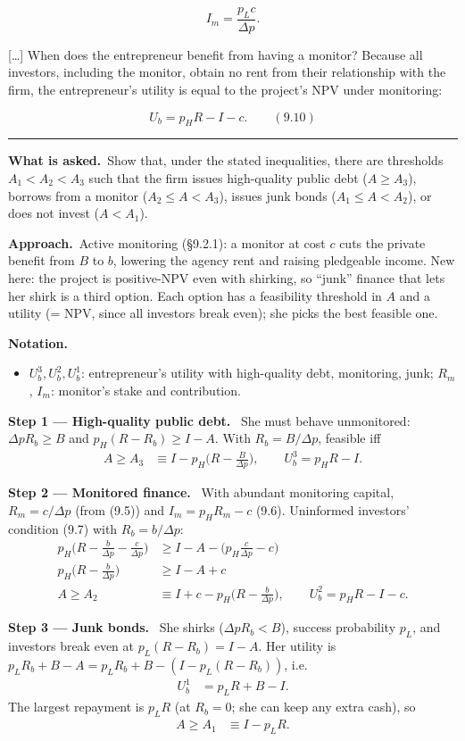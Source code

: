 \documentclass[11pt,a4paper]{article}
\newcommand{\notation}{\par\noindent\textbf{Notation.}}
\newcommand{\step}[2]{\par\medskip\noindent\textbf{Step #1 --- #2.}~}
\newcommand{\asked}{\par\medskip\noindent\textbf{What is asked.}~}
\newcommand{\approach}{\par\smallskip\noindent\textbf{Approach.}~}
\newcommand{\dpp}{\Delta p}
\newcommand{\stmtend}{\par\endgroup\nopagebreak\noindent\rule{\linewidth}{0.4pt}\par\medskip}
\begin{document}
\[I_m = \frac{p_L c}{\Delta p}.\]

{[}\ldots{]} When does the entrepreneur benefit from having a monitor? Because all investors,
including the monitor, obtain no rent from their relationship with the firm, the entrepreneur's
utility is equal to the project's NPV under monitoring:

\[U_b = p_H R - I - c. \qquad (9.10)\]
\stmtend

\asked Show that, under the stated inequalities, there are thresholds $A_1<A_2<A_3$ such that the firm issues high-quality public debt ($A\ge A_3$), borrows from a monitor ($A_2\le A<A_3$), issues junk bonds ($A_1\le A<A_2$), or does not invest ($A<A_1$).

\approach Active monitoring (\S9.2.1): a monitor at cost $c$ cuts the private benefit from $B$ to $b$, lowering the agency rent and raising pledgeable income. New here: the project is positive-NPV even with shirking, so ``junk'' finance that lets her shirk is a third option. Each option has a feasibility threshold in $A$ and a utility (= NPV, since all investors break even); she picks the best feasible one.

\notation
\begin{itemize}
  \item $U^3_b,U^2_b,U^1_b$: entrepreneur's utility with high-quality debt, monitoring, junk; $R_m$, $I_m$: monitor's stake and contribution.
\end{itemize}

\step{1}{High-quality public debt} She must behave unmonitored: $\dpp R_b\ge B$ and $p_H(R-R_b)\ge I-A$. With $R_b=B/\dpp$, feasible iff
\begin{align}
  A\ge A_3 &\equiv I-p_H\Big(R-\frac{B}{\dpp}\Big), \qquad U^3_b=p_HR-I. \label{r8e11-A3}
\end{align}

\step{2}{Monitored finance} With abundant monitoring capital, $R_m=c/\dpp$ (from (9.5)) and $I_m=p_HR_m-c$ (9.6). Uninformed investors' condition (9.7) with $R_b=b/\dpp$:
\begin{align}
  p_H\Big(R-\frac{b}{\dpp}-\frac{c}{\dpp}\Big) &\ge I-A-\Big(p_H\frac{c}{\dpp}-c\Big) \nonumber\\
  p_H\Big(R-\frac{b}{\dpp}\Big) &\ge I-A+c \nonumber\\
  A\ge A_2 &\equiv I+c-p_H\Big(R-\frac{b}{\dpp}\Big), \qquad U^2_b=p_HR-I-c. \label{r8e11-A2}
\end{align}

\step{3}{Junk bonds} She shirks ($\dpp R_b<B$), success probability $p_L$, and investors break even at $p_L(R-R_b)=I-A$. Her utility is $p_LR_b+B-A=p_LR_b+B-(I-p_L(R-R_b))$, i.e.
\begin{align}
  U^1_b &= p_LR+B-I. \nonumber
\end{align}
The largest repayment is $p_LR$ (at $R_b=0$; she can keep any extra cash), so
\begin{align}
  A\ge A_1 &\equiv I-p_LR. \label{r8e11-A1}
\end{align}
\end{document}
